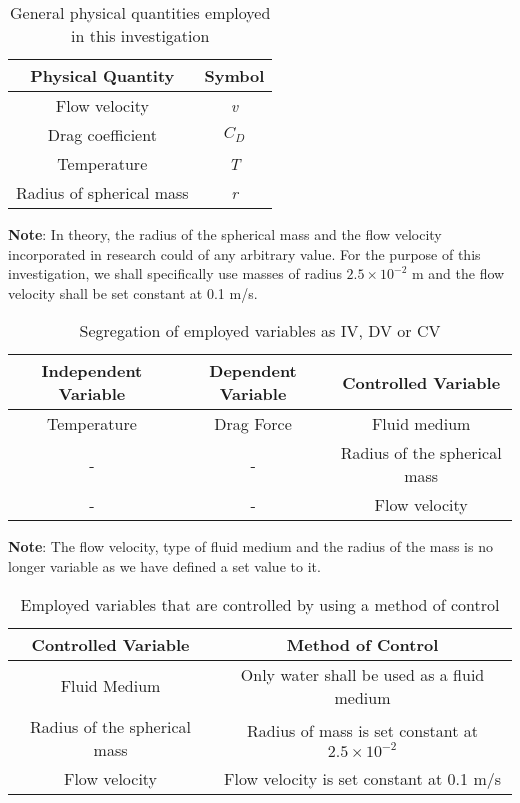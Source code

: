 \begin{table}[H]
    \centering
        \begin{tabular}{|c|c|}
        \hline
        \hline
        {Physical Quantity} & {Symbol} \\
        \hline
        \hline
        {Flow velocity} & \textit{v} \\
        \hline
        {Drag coefficient} & \textit{$C_D$} \\
		\hline        
        {Temperature} & \textit{T} \\
        \hline
        {Radius of spherical mass} & \textit{r} \\
        \hline
        \hline
        \end{tabular}
    \caption{{General physical quantities employed in this investigation}}
\end{table}

{\textbf{Note}: In theory, the radius of the spherical mass and the flow velocity  incorporated in research could of any arbitrary value. For the purpose of this investigation, we shall specifically use masses of radius $2.5\times10^{-2}$ m and the flow velocity shall be set constant at 0.1 m/s.}

\begin{table}[H]
    \centering
        \begin{tabular}{|c|c|c|}
        \hline
        \hline
        {Independent Variable} & {Dependent Variable} & {Controlled Variable} \\
        \hline
        \hline
        {Temperature} & {Drag Force} & {Fluid medium} \\
        \hline
        {-} & {-} & {Radius of the spherical mass} \\
        \hline
        {-} & {-} & {Flow velocity} \\
        \hline
        \hline
        \end{tabular}
    \caption{{Segregation of employed variables as IV, DV or CV}}
\end{table}

{\textbf{Note}: The flow velocity, type of fluid medium and the radius of the mass is no longer variable as we have defined a set value to it.}

\begin{table}[H]
    \centering
        \begin{tabular}{|c|c|}
        \hline
        \hline
        {Controlled Variable} & {Method of Control} \\
        \hline
        \hline
        {Fluid Medium} & {Only water shall be used as a fluid medium} \\
        \hline
        {Radius of the spherical mass} & {Radius of mass is set constant at $2.5\times 10^{-2}$} \\
		\hline        
        {Flow velocity} & {Flow velocity is set constant at 0.1 m/s} \\
        \hline
        \hline
        \end{tabular}
    \caption{{Employed variables that are controlled by using a method of control}}
\end{table}

